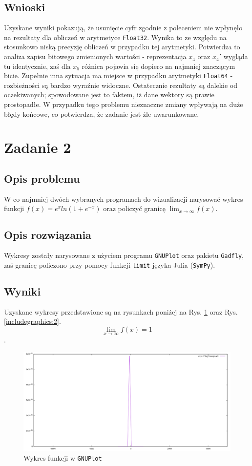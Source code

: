 \documentclass{classrep}
\begin{document}
	\subsection{Wnioski}
		Uzyskane wyniki pokazują, że usunięcie cyfr zgodnie z poleceniem nie wpłynęło na rezultaty dla obliczeń w arytmetyce \texttt{Float32}. Wynika to ze względu na stosunkowo niską precyzję obliczeń w przypadku tej arytmetyki. Potwierdza to analiza zapisu bitowego zmienionych wartości - reprezentacja $x_4$ oraz $x_4'$ wygląda tu identycznie, zaś dla $x_5$ różnica pojawia się dopiero na najmniej znaczącym bicie.
		Zupełnie inna sytuacja ma miejsce w przypadku arytmetyki \texttt{Float64} - rozbieżności są bardzo wyraźnie widoczne. Ostatecznie rezultaty są dalekie od oczekiwanych; spowodowane jest to faktem, iż dane wektory są prawie prostopadłe. W przypadku tego problemu nieznaczne zmiany wpływają na duże błędy końcowe, co potwierdza, że zadanie jest źle uwarunkowane.
\section{Zadanie 2}
	\subsection{Opis problemu}
		W co najmniej dwóch wybranych programach do wizualizacji narysować wykres funkcji $f(x)=e^{x}ln(1+e^{-x})$ oraz policzyć granicę $\lim_{x \to \infty} f(x)$.
		
	\subsection{Opis rozwiązania}
		Wykresy zostały narysowane z użyciem programu \texttt{GNUPlot} oraz pakietu \texttt{Gadfly}, zaś granicę policzono przy pomocy funkcji \texttt{limit} języka Julia (\texttt{SymPy}).
	\subsection{Wyniki}
		Uzyskane wykresy przedstawione są na rysunkach poniżej na Rys. \ref{includegraphics:1} oraz Rys. \ref{includegraphics:2}.
		$$\lim_{x \to \infty} f(x) = 1$$.
		
		\begin{figure} 
  			\includegraphics[scale=0.5, width=\textwidth]{zad2/plotGnu.png}
  			\caption{Wykres funkcji w \texttt{GNUPlot}}
  			\label{includegraphics:1}
  		\end{figure}
  		
\end{document}
